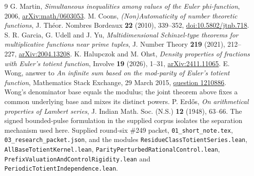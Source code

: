 \documentclass[11pt,a4paper]{article}
\theoremstyle{definition}\newtheorem{definition}[theorem]{Definition}
\theoremstyle{remark}\newtheorem{remark}[theorem]{Remark}
\begin{document}
\begin{thebibliography}{9}\small
{} G. Martin, \emph{Simultaneous inequalities among values of the
Euler phi-function}, 2006, \href{https://arxiv.org/abs/math/0603053}{arXiv:math/0603053}.
 M. Coons, \emph{(Non)Automaticity of number theoretic functions},
J. Th\'eor. Nombres Bordeaux \textbf{22} (2010), 339--352,
\href{https://doi.org/10.5802/jtnb.718}{doi:10.5802/jtnb.718}.
 S. R. Garcia, G. Udell and J. Yu,
\emph{Multidimensional Schinzel-type theorems for multiplicative functions near
prime tuples}, J. Number Theory \textbf{219} (2021), 212--227,
\href{https://arxiv.org/abs/2004.13208}{arXiv:2004.13208}.
 K. Halupczok and M. Ohst, \emph{Density properties of fractions with
Euler's totient function}, Involve \textbf{19} (2026), 1--31,
\href{https://arxiv.org/abs/2411.11065}{arXiv:2411.11065}.
 E. Wong, answer to \emph{An infinite sum based on the mod-parity
of Euler's totient function}, Mathematics Stack Exchange, 29 March 2015,
\href{https://math.stackexchange.com/questions/1210886}{question 1210886}.
Wong's denominator base equals the modulus; the joint theorem above fixes a
common underlying base and mixes its distinct powers.
 P. Erd\H{o}s, \emph{On arithmetical properties of Lambert series},
J. Indian Math. Soc. (N.S.) \textbf{12} (1948), 63--66.
The signed bounded-pulse formulation in the supplied corpus isolates the
separation mechanism used here.
 Supplied round-six \#249 packet, \texttt{01\_short\_note.tex},
\texttt{03\_research\_packet.json}, and the modules
\texttt{ResidueClassTotientSeries.lean},
\texttt{AllBaseTotientKernel.lean},
\texttt{ParityPerturbedRationalControl.lean},
\texttt{PrefixValuationAndControlRigidity.lean} and
\texttt{PeriodicTotientIndependence.lean}.
\end{thebibliography}
\end{document}
